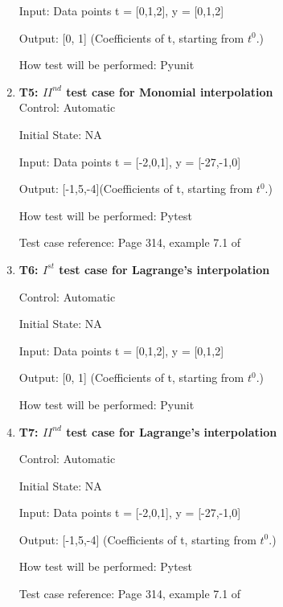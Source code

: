 \documentclass[12pt, titlepage]{article}
\begin{document}
\begin{enumerate}
Input: Data points t = [0,1,2], y = [0,1,2]

Output: [0, 1] (Coefficients of t, starting from $t^{0}$.)

How test will be performed: Pyunit\\




\item{\textbf{T5: ${II}^{nd}$ test case for Monomial interpolation}}\\

Control: Automatic
					
Initial State: NA
					
Input: Data points t = [-2,0,1], y = [-27,-1,0]

Output: [-1,5,-4](Coefficients of t, starting from $t^{0}$.)

How test will be performed: Pytest

Test case reference: Page 314, example 7.1 of ~\cite{Health1997}\\


					
\item{\textbf{T6: $I^{st}$ test case for Lagrange's interpolation} \\}

Control: Automatic 

Initial State: NA

Input: Data points t = [0,1,2], y = [0,1,2]

Output: [0, 1] (Coefficients of t, starting from $t^{0}$.)

How test will be performed: Pyunit\\



\item{\textbf{T7: ${II}^{nd}$ test case for Lagrange's interpolation} \\}


Control: Automatic

Initial State: NA

Input: Data points t = [-2,0,1], y = [-27,-1,0]

Output: [-1,5,-4] (Coefficients of t, starting from $t^{0}$.)

How test will be performed: Pytest

Test case reference: Page 314, example 7.1 of  ~\cite{Health1997}\\



\end{enumerate}
\end{document}
